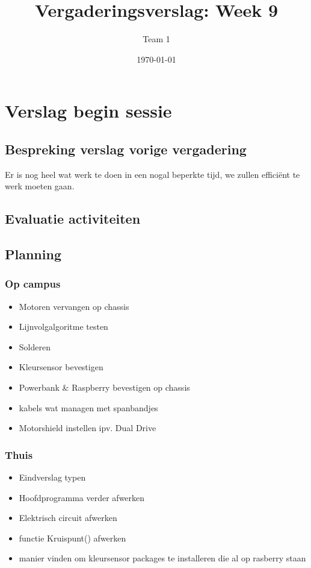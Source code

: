 \documentclass[a4paper,kulak]{kulakarticle} %
\date{\today}
\title{Vergaderingsverslag: Week 9}
\author{Team 1}
\begin{document}
\maketitle

\section{Verslag begin sessie}
\subsection{Bespreking verslag vorige vergadering}
Er is nog heel wat werk te doen in een nogal beperkte tijd, we zullen efficiënt te werk moeten gaan. 
\subsection{Evaluatie activiteiten}

\subsection{Planning}
\subsubsection*{Op campus}
\begin{itemize}
	\item Motoren vervangen op chassis
	\item Lijnvolgalgoritme testen
	\item Solderen
	\item Kleursensor bevestigen
	\item Powerbank \& Raspberry bevestigen op chassis
	\item kabels wat managen met spanbandjes
	\item Motorshield instellen ipv. Dual Drive
\end{itemize}

\subsubsection*{Thuis}
\begin{itemize}
	\item Eindverslag typen
	\item Hoofdprogramma verder afwerken
	\item Elektrisch circuit afwerken
	\item functie Kruispunt() afwerken
	\item manier vinden om kleursensor packages te installeren die al op rasberry staan
\end{itemize}
\end{document}
